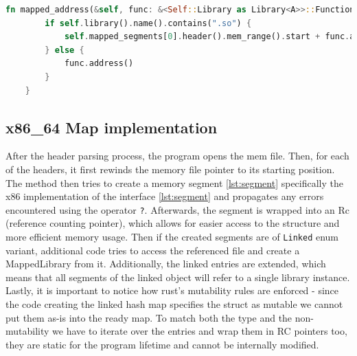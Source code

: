 \begin{lstlisting}[caption=\label{mapped_lib:mapped_addr}"The mapped\_address function for the MappedLibrary struct", language=Rust, breaklines=true]
fn mapped_address(&self, func: &<Self::Library as Library<A>>::Function) -> u64 {
        if self.library().name().contains(".so") {
            self.mapped_segments[0].header().mem_range().start + func.address()
        } else {
            func.address()
        }
    }
\end{lstlisting}



\subsection{x86\_64 Map implementation}

After the header parsing process, the program opens the mem file.
Then, for each of the headers, it first rewinds the memory file pointer to its starting position.
The method then tries to create a memory segment \autoref{lst:segment} specifically the x86 implementation of the interface \autoref{lst:segment} and propagates any errors encountered using the operator \verb|?|.
Afterwards, the segment is wrapped into an Rc (reference counting pointer), which allows for easier access to the structure and more efficient memory usage. 
Then if the created segments are of \verb|Linked| enum variant, additional code tries to access the referenced file and create a MappedLibrary from it.
Additionally, the linked entries are extended, which means that all segments of the linked object will refer to a single library instance.
Lastly, it is important to notice how rust's mutability rules are enforced - since the code creating the linked hash map specifies the struct as mutable we cannot put them as-is into the ready map.
To match both the type and the non-mutability we have to iterate over the entries and wrap them in RC pointers too, they are static for the program lifetime and cannot be internally modified. 

